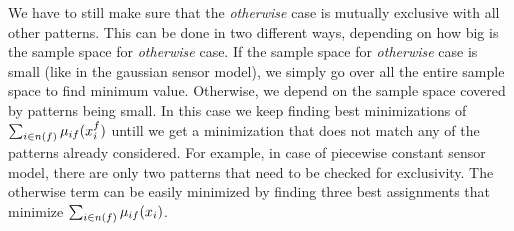 \documentclass[letterpaper, 10 pt, conference]{ieeeconf} %
\DeclareMathOperator*{\argmin}{arg\,min}
\newcommand{\vect}[1]{\mathbf{#1}}
\begin{document}
We have to still make sure that the \emph{otherwise} case is mutually
exclusive with all other patterns.  This can be done in two different ways,
depending on how big is the sample space for \emph{otherwise} case. If the
sample space for \emph{otherwise} case is small (like in the gaussian sensor
model), we simply go over all the entire sample space to find minimum value.
Otherwise, we depend on the sample space covered by patterns being small. In this case 
we keep finding best minimizations of $\sum_{i \in n(f)} \mu_{if}(x_i^f)$
untill we get a minimization that does not match any of the
patterns already considered. 
% 
For example, in case of piecewise constant sensor model, there are only two
patterns that need to be checked for exclusivity. The otherwise term can be
easily minimized by finding three best assignments that minimize 
$\sum_{i \in n(f)}\mu_{if}(x_i)$.

\end{document}
